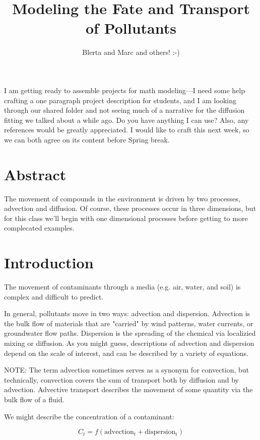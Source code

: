 \documentclass{tufte-handout}\usepackage[]{graphicx}\usepackage[]{color}
\author{Blerta and Marc and others! :-)}
\title{Modeling the Fate and Transport of Pollutants}
\begin{document}
\maketitle


I am getting ready to assemble projects for math modeling—I need some help crafting a one paragraph project description for students, and I am looking through our shared folder and not seeing much of a narrative for the diffusion fitting we talked about a while ago. Do you have anything I can use? Also, any references would be greatly appreciated. I would like to craft this next week, so we can both agree on its content before Spring break. 


\section{Abstract}
\noindent The movement of compounds in the environment is driven by two processes, advection and diffusion. Of course, these processes occur in three dimensions, but for this class we'll begin with one dimensional processes before getting to more complecated examples.

\section{Introduction}

The movement of contaminants through a media (e.g. air, water, and soil) is complex and difficult to predict. 

In general, pollutants move in two ways: advection and dispersion. Advection is the bulk flow of materials that are "carried" by wind patterns, water currents, or groundwater flow paths. Dispersion is the spreading of the chemical via localizied mixing or diffusion. As you might guess, descriptions of advection and dispersion depend on the scale of interest, and can be described by a variety of equations.

NOTE: The term advection sometimes serves as a synonym for convection, but technically, convection covers the sum of transport both by diffusion and by advection. Advective transport describes the movement of some quantity via the bulk flow of a fluid.

We might describe the concentration of a contaminant:

\begin{equation}
C_t = f(\mathrm{advection}_t + \mathrm{dispersion_t})
\end{equation}
\end{document}
